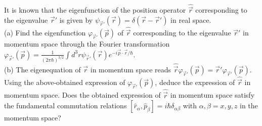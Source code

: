 \documentclass[12pt,a4paper]{article}
\newenvironment{problem}[2][Problem]{\begin{trivlist}
\item[\hskip \labelsep {\bfseries #1}\hskip \labelsep {\bfseries #2.}]}{\end{trivlist}}
\begin{document}
\begin{problem}{3}
It is known that the eigenfunction of the position operator $\hat{\vec{r}}$ corresponding to the eigenvalue $\vec{r}'$ is given by $\psi_{\vec{r}'}(\vec{r})=\delta(\vec{r}-\vec{r}')$ in real space.\\
(a) Find the eigenfunction $\varphi_{\vec{r}'}(\vec{p})$ of $\hat{\vec{r}}$ corresponding to the eigenvalue $\vec{r}'$ in momentum space through the Fourier transformation $\varphi_{\vec{r}'}(\vec{p})=\frac{1}{(2\pi\hbar)^{3/2}}\int d^3r\psi_{\vec{r}'}(\vec{r})e^{-i\vec{p}\cdot\vec{r}/\hbar}$.\\
(b) The eigenequation of $\vec{r}$ in momentum space reads $\hat{\vec{r}}\varphi_{\vec{r}'}(\vec{p})=\vec{r}'\varphi_{\vec{r}'}(\vec{p})$. Using the above-obtained expression of $\varphi_{\vec{r}'}(\vec{p})$, deduce the expression of $\hat{\vec{r}}$ in momentum space. Does the obtained expression of $\hat{\vec{r}}$ in momentum space satisfy the fundamental commutation relations $[\hat{r}_{\alpha},\hat{p}_{\beta}]=i\hbar\delta_{\alpha\beta}$ with $\alpha,\beta=x,y,z$ in the momentum space?
\end{problem}
\end{document}
